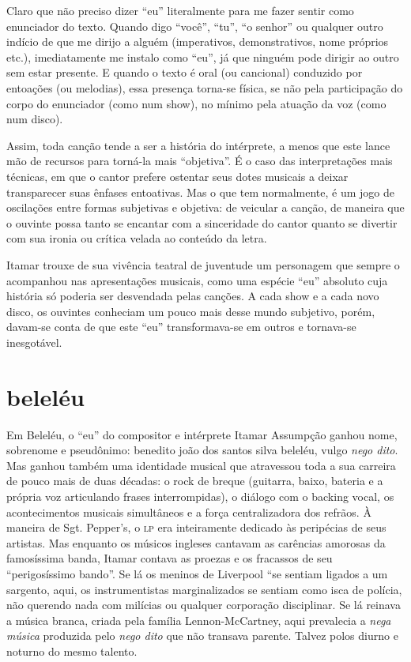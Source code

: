 Claro que não preciso dizer ``eu'' literalmente para me fazer sentir
como enunciador do texto. Quando digo ``você'', ``tu'', ``o senhor'' ou
qualquer outro indício de que me dirijo a alguém (imperativos,
demonstrativos, nome próprios etc.), imediatamente me instalo como
``eu'', já que ninguém pode dirigir ao outro sem estar presente. E
quando o texto é oral (ou cancional) conduzido por entoações (ou
melodias), essa presença torna-se física, se não pela participação do
corpo do enunciador (como num show), no mínimo pela atuação da voz (como
num disco).

Assim, toda canção tende a ser a história do intérprete, a menos que
este lance mão de recursos para torná-la mais ``objetiva''. É o caso das
interpretações mais técnicas, em que o cantor prefere ostentar seus
dotes musicais a deixar transparecer suas ênfases entoativas. Mas o que
tem normalmente, é um jogo de oscilações entre formas subjetivas e
objetiva: de veicular a canção, de maneira que o ouvinte possa tanto se
encantar com a sinceridade do cantor quanto se divertir com sua ironia
ou crítica velada ao conteúdo da letra.

Itamar trouxe de sua vivência teatral de juventude um personagem que
sempre o acompanhou nas apresentações musicais, como uma espécie ``eu''
absoluto cuja história só poderia ser desvendada pelas canções. A cada
show e a cada novo disco, os ouvintes conheciam um pouco mais desse
mundo subjetivo, porém, davam-se conta de que este ``eu''
transformava-se em outros e tornava-se inesgotável.

\section{beleléu}

Em Beleléu, o ``eu'' do compositor e intérprete Itamar Assumpção ganhou
nome, sobrenome e pseudônimo: benedito joão dos santos silva beleléu,
vulgo \textit{nego dito}. Mas ganhou também uma identidade musical que atravessou
toda a sua carreira de pouco mais de duas décadas: o rock de breque
(guitarra, baixo, bateria e a própria voz articulando frases
interrompidas), o diálogo com o backing vocal, os acontecimentos
musicais simultâneos e a força centralizadora dos refrãos. À maneira de
Sgt. Pepper's, o \textsc{lp} era inteiramente dedicado às peripécias de seus
artistas. Mas enquanto os músicos ingleses cantavam as carências
amorosas da famosíssima banda, Itamar contava as proezas e os fracassos
de seu ``perigosíssimo bando''. Se lá os meninos de Liverpool ``se
sentiam ligados a um sargento, aqui, os instrumentistas marginalizados
se sentiam como isca de polícia, não querendo nada com milícias ou
qualquer corporação disciplinar. Se lá reinava a música branca, criada
pela família Lennon-McCartney, aqui prevalecia a \textit{nega música}
produzida pelo \textit{nego dito} que não transava parente. Talvez polos
diurno e noturno do mesmo talento.

